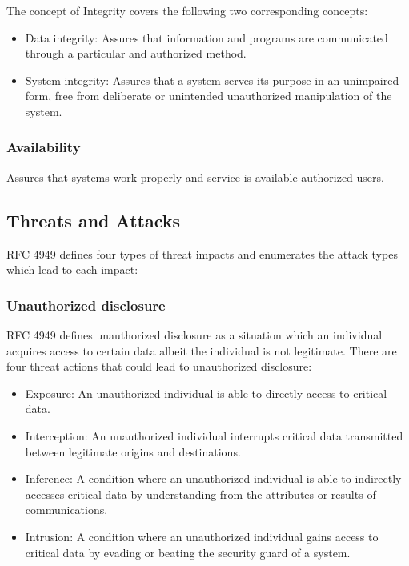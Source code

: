 \documentclass[conference]{IEEEtran}
\begin{document}
The concept of Integrity covers the following two corresponding concepts:

\begin{itemize}

  \item Data integrity: Assures that information and programs are communicated through a particular
    and authorized method.

  \item System integrity: Assures that a system serves its purpose in an unimpaired form, free from
    deliberate or unintended unauthorized manipulation of the system.

\end{itemize}

\subsubsection{Availability}

Assures that systems work properly and service is available authorized users.


\subsection{Threats and Attacks}

RFC 4949 defines four types of threat impacts and enumerates the attack types which lead to each
impact:

\subsubsection{Unauthorized disclosure}

RFC 4949 defines unauthorized disclosure as a situation which an individual acquires access to
certain data albeit the individual is not legitimate. There are four threat actions that could lead
to unauthorized disclosure:

\begin{itemize}

  \item Exposure: An unauthorized individual is able to directly access to critical data.

  \item Interception: An unauthorized individual interrupts critical data transmitted between
    legitimate origins and destinations.

  \item Inference: A condition where an unauthorized individual is able to indirectly accesses
    critical data by understanding from the attributes or results of communications.

  \item Intrusion: A condition where an unauthorized individual gains access to critical data by
    evading or beating the security guard of a system.

\end{itemize}
\end{document}
